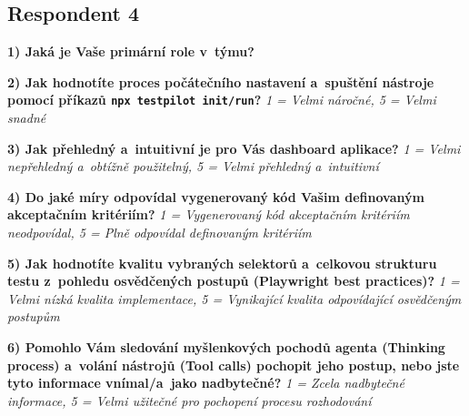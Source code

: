 \documentclass[czech, ing, kiv, he, iso690numb, viewonly]{fasthesis}
\begin{document}
\subsection*{Respondent 4}
\begin{tcolorbox}[breakable, colback=gray!3, colframe=black!35, boxrule=0.4pt, arc=2pt, title={Google Forms - export odpovědi}]

\textbf{1) Jaká je Vaše primární role v~týmu?}

 \quad {} \quad {} 

\quad {} \quad {}

\textbf{2) Jak hodnotíte proces počátečního nastavení a~spuštění nástroje pomocí příkazů \texttt{npx testpilot init/run}?}
\textit{1 = Velmi náročné, 5 = Velmi snadné}

 \quad {} \quad {} \quad {} \quad {}

\textbf{3) Jak přehledný a~intuitivní je pro Vás dashboard aplikace?}
\textit{1 = Velmi nepřehledný a~obtížně použitelný, 5 = Velmi přehledný a~intuitivní}

 \quad {} \quad {} \quad {} \quad {}

\textbf{4) Do jaké míry odpovídal vygenerovaný kód Vašim definovaným akceptačním kritériím?}
\textit{1 = Vygenerovaný kód akceptačním kritériím neodpovídal, 5 = Plně odpovídal definovaným kritériím}

 \quad {} \quad {} \quad {} \quad {}

\textbf{5) Jak hodnotíte kvalitu vybraných selektorů a~celkovou strukturu testu z~pohledu osvědčených postupů (Playwright best practices)?}
\textit{1 = Velmi nízká kvalita implementace, 5 = Vynikající kvalita odpovídající osvědčeným postupům}

 \quad {} \quad {} \quad {} \quad {}

\textbf{6) Pomohlo Vám sledování myšlenkových pochodů agenta (Thinking process) a~volání nástrojů (Tool calls) pochopit jeho postup, nebo jste tyto informace vnímal/a~jako nadbytečné?}
\textit{1 = Zcela nadbytečné informace, 5 = Velmi užitečné pro pochopení procesu rozhodování}

 \quad {} \quad {} \quad {} \quad {}


\end{tcolorbox}
\end{document}
